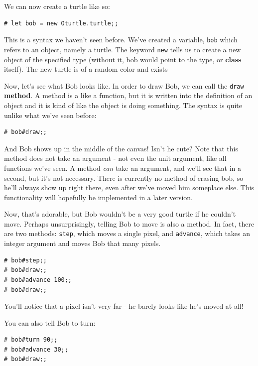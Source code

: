 \documentclass[10pt]{book}
\begin{document}
{We can now create a turtle like so:

\beforeverb
\begin{verbatim}
# let bob = new Oturtle.turtle;;
\end{verbatim}
\afterverb

This is a syntax we haven't seen before. We've created a variable, {\tt bob} which refers to an object, namely a turtle. The keyword {\tt new} tells us to create a new object of the specified type (without it, bob would point to the type, or {\bf class} itself). The new turtle is of a random color and exists

Now, let's see what Bob looks like. In order to draw Bob, we can call the {\tt draw} {\bf method}. A method is a like a function, but it is written into the definition of an object and it is kind of like the object is doing something. The syntax is quite unlike what we've seen before:

\beforeverb
\begin{verbatim}
# bob#draw;;
\end{verbatim}
\afterverb

And Bob shows up in the middle of the canvas! Isn't he cute? Note that this method does not take an argument - not even the unit argument, like all functions we've seen. A method {\it can} take an argument, and we'll see that in a second, but it's not necessary. There is currently no method of erasing bob, so he'll always show up right there, even after we've moved him someplace else. This functionality will hopefully be implemented in a later version.

Now, that's adorable, but Bob wouldn't be a very good turtle if he couldn't move. Perhaps unsurprisingly, telling Bob to move is also a method. In fact, there are two methods: {\tt step}, which moves a single pixel, and {\tt advance}, which takes an integer argument and moves Bob that many pixels.

\beforeverb
\begin{verbatim}
# bob#step;;
# bob#draw;;
# bob#advance 100;;
# bob#draw;;
\end{verbatim}
\afterverb

You'll notice that a pixel isn't very far - he barely looks like he's moved at all!

You can also tell Bob to turn:

\beforeverb
\begin{verbatim}
# bob#turn 90;;
# bob#advance 30;;
# bob#draw;;
\end{verbatim}
\afterverb

}
\end{document}
